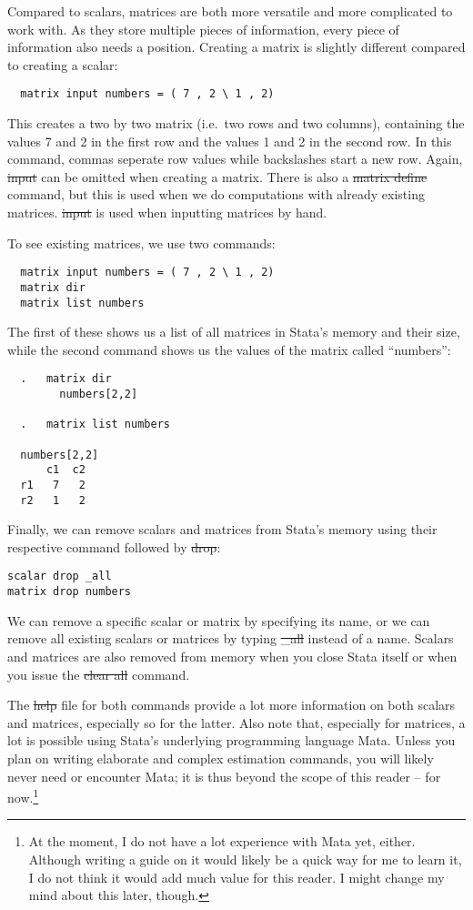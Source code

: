 Compared to scalars, matrices are both more versatile and more complicated to work with.
As they store multiple pieces of information, every piece of information also needs a position.
Creating a matrix is slightly different compared to creating a scalar:
\begin{verbatim}
  matrix input numbers = ( 7 , 2 \ 1 , 2)
\end{verbatim}
This creates a two by two matrix (i.e.\ two rows and two columns),
containing the values 7 and 2 in the first row and the values 1 and 2 in the second row.
In this command, commas seperate row values while backslashes start a new row.
Again, \st{input} can be omitted when creating a matrix.
There is also a \st{matrix define} command,
but this is used when we do computations with already existing matrices.
\st{input} is used when inputting matrices by hand.

To see existing matrices, we use two commands:
\begin{verbatim}
  matrix input numbers = ( 7 , 2 \ 1 , 2)
  matrix dir
  matrix list numbers
\end{verbatim}
The first of these shows us a list of all matrices in Stata's memory and their size,
while the second command shows us the values of the matrix called ``numbers'':
\small\begin{verbatim}
  .   matrix dir
        numbers[2,2]

  .   matrix list numbers

  numbers[2,2]
      c1  c2
  r1   7   2
  r2   1   2
\end{verbatim}\normalsize

Finally,
we can remove scalars and matrices from Stata's memory using their respective command followed by \st{drop}:
\begin{verbatim}
scalar drop _all
matrix drop numbers
\end{verbatim}
We can remove a specific scalar or matrix by specifying its name,
or we can remove all existing scalars or matrices by typing \st{_all} instead of a name.
Scalars and matrices are also removed from memory when you close Stata itself or when you issue the \st{clear all} command.

The \st{help} file for both commands provide a lot more information on both scalars and matrices, especially so for the latter.
Also note that, especially for matrices, a lot is possible using Stata's underlying programming language Mata.
Unless you plan on writing elaborate and complex estimation commands,
you will likely never need or encounter Mata;
it is thus beyond the scope of this reader -- for now.\footnote{At the moment, I do not have a lot experience with Mata yet, either. Although writing a guide on it would likely be a quick way for me to learn it, I do not think it would add much value for this reader. I might change my mind about this later, though.}

